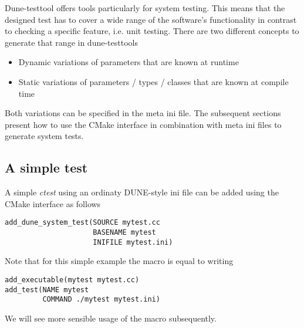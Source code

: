 \documentclass[11pt]{article}
\begin{document}
Dune-testtool offers tools particularly for system testing. This means that the designed test has to cover a wide range of the
software's functionality in contrast to checking a specific feature, i.e. unit testing. There are two different concepts to
generate that range in dune-testtools
\begin{itemize}
 \item Dynamic variations of parameters that are known at runtime
 \item Static variations of parameters / types / classes that are known at compile time
\end{itemize}
Both variations can be specified in the meta ini file.
The subsequent sections present how to use the CMake interface in combination with meta ini files to generate system tests.

\subsection{A simple test}
A simple \emph{ctest} using an ordinaty DUNE-style ini file can be added using the CMake interface as follows
\begin{lstlisting}[caption={A CMakeLists.txt adding a simple test with the dune-testtools CMake interface function \lstinline!add_dune_system_test!}]
add_dune_system_test(SOURCE mytest.cc
                     BASENAME mytest
                     INIFILE mytest.ini)
\end{lstlisting}

Note that for this simple example the macro is equal to writing
\begin{lstlisting}[caption={A CMakeLists.txt adding a simple test with the standard CMake macros}]
add_executable(mytest mytest.cc)
add_test(NAME mytest
         COMMAND ./mytest mytest.ini)
\end{lstlisting}
We will see more sensible usage of the macro subsequently.
\end{document}

